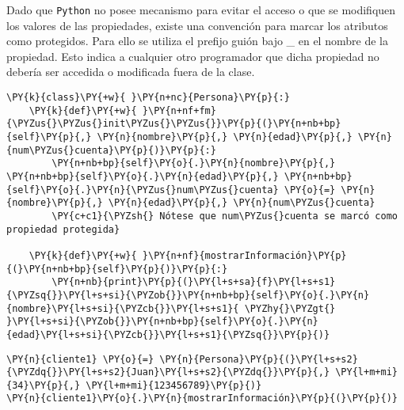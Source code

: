 Dado que \texttt{Python} no posee mecanismo para evitar el acceso o que
se modifiquen los valores de las propiedades, existe una convención para
marcar los atributos como protegidos. Para ello se utiliza el prefijo
guión bajo \_ en el nombre de la propiedad. Esto indica a cualquier otro
programador que dicha propiedad no debería ser accedida o modificada
fuera de la clase.

    \begin{tcolorbox}[breakable, size=fbox, boxrule=1pt, pad at break*=1mm,colback=cellbackground, colframe=cellborder]
\begin{Verbatim}[commandchars=\\\{\}]
\PY{k}{class}\PY{+w}{ }\PY{n+nc}{Persona}\PY{p}{:}
    \PY{k}{def}\PY{+w}{ }\PY{n+nf+fm}{\PYZus{}\PYZus{}init\PYZus{}\PYZus{}}\PY{p}{(}\PY{n+nb+bp}{self}\PY{p}{,} \PY{n}{nombre}\PY{p}{,} \PY{n}{edad}\PY{p}{,} \PY{n}{num\PYZus{}cuenta}\PY{p}{)}\PY{p}{:}
        \PY{n+nb+bp}{self}\PY{o}{.}\PY{n}{nombre}\PY{p}{,} \PY{n+nb+bp}{self}\PY{o}{.}\PY{n}{edad}\PY{p}{,} \PY{n+nb+bp}{self}\PY{o}{.}\PY{n}{\PYZus{}num\PYZus{}cuenta} \PY{o}{=} \PY{n}{nombre}\PY{p}{,} \PY{n}{edad}\PY{p}{,} \PY{n}{num\PYZus{}cuenta} 
        \PY{c+c1}{\PYZsh{} Nótese que num\PYZus{}cuenta se marcó como propiedad protegida}

    \PY{k}{def}\PY{+w}{ }\PY{n+nf}{mostrarInformación}\PY{p}{(}\PY{n+nb+bp}{self}\PY{p}{)}\PY{p}{:}
        \PY{n+nb}{print}\PY{p}{(}\PY{l+s+sa}{f}\PY{l+s+s1}{\PYZsq{}}\PY{l+s+si}{\PYZob{}}\PY{n+nb+bp}{self}\PY{o}{.}\PY{n}{nombre}\PY{l+s+si}{\PYZcb{}}\PY{l+s+s1}{ \PYZhy{}\PYZgt{} }\PY{l+s+si}{\PYZob{}}\PY{n+nb+bp}{self}\PY{o}{.}\PY{n}{edad}\PY{l+s+si}{\PYZcb{}}\PY{l+s+s1}{\PYZsq{}}\PY{p}{)}
\end{Verbatim}
\end{tcolorbox}

    \begin{tcolorbox}[breakable, size=fbox, boxrule=1pt, pad at break*=1mm,colback=cellbackground, colframe=cellborder]
\begin{Verbatim}[commandchars=\\\{\}]
\PY{n}{cliente1} \PY{o}{=} \PY{n}{Persona}\PY{p}{(}\PY{l+s+s2}{\PYZdq{}}\PY{l+s+s2}{Juan}\PY{l+s+s2}{\PYZdq{}}\PY{p}{,} \PY{l+m+mi}{34}\PY{p}{,} \PY{l+m+mi}{123456789}\PY{p}{)}
\PY{n}{cliente1}\PY{o}{.}\PY{n}{mostrarInformación}\PY{p}{(}\PY{p}{)}
\end{Verbatim}
\end{tcolorbox}


